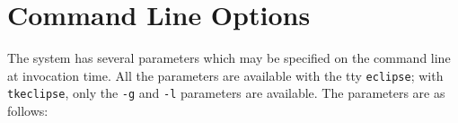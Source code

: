 %
% 
% 
% 
% 
\chapter{{\eclipse} Command Line Options}

The {\eclipse} system has several parameters which may be specified on the
command line at invocation time. All the parameters are available with
the tty {\tt eclipse}; with {\tt tkeclipse}, only the {\tt -g} and {\tt -l}
parameters are available.
The parameters are as follows:

